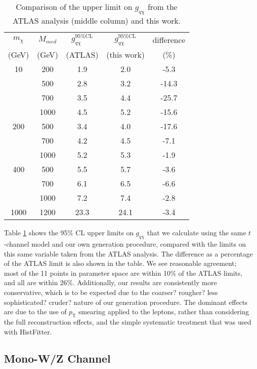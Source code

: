 \begin{flushleft}
\begin{table}
\begin{center}
\begin{tabular}{| c | c | c | c | c |}
\hline
$m_{\chi}$ & $M_{med}$ & $g_{q \chi}^{95\%\mathrm{CL}}$ & $g_{q \chi}^{95\%\mathrm{CL}}$ & difference \T \\
(GeV) & (GeV) & (ATLAS) & (this work) & (\%) \B \\
\hline
\hline
10 & 200 & 1.9 & 2.0 & -5.3 \T \\
 & 500 & 2.8 & 3.2 & -14.3 \\
 & 700 & 3.5 & 4.4 & -25.7 \\
 & 1000 & 4.5 & 5.2 & -15.6 \\
200 & 500 & 3.4 & 4.0 & -17.6 \T \\
 & 700 & 4.2 & 4.5 & -7.1 \\
 & 1000 & 5.2 & 5.3 & -1.9 \\
400 & 500 & 5.5 & 5.7 & -3.6 \T \\
 & 700 & 6.1 & 6.5 & -6.6 \\
 & 1000 & 7.2 & 7.4 & -2.8 \\
1000 & 1200 & 23.3 & 24.1 & -3.4 \T \B \\
\hline
\end{tabular}
\end{center}
\caption{Comparison of the upper limit on $g_{q \chi}$ from the ATLAS analysis (middle column) and this work.}
\label{tab:monoZvalidation}
\end{table} 

Table \ref{tab:monoZvalidation} shows the 95\% CL upper limits on $g_{q \chi}$ that we calculate using the same $t$-channel model and our own generation procedure, compared with the limits on this same variable taken from the ATLAS analysis. The difference as a percentage of the ATLAS limit is also shown in the table. We see reasonable agreement; most of the 11 points in parameter space are within 10\% of the ATLAS limits, and all are within 26\%. Additionally, our results are consistently more conservative, which is to be expected due to the coarser? rougher? less sophisticated? cruder? nature of our generation procedure. The dominant effects are due to the use of $p_{\mathrm{T}}$ smearing applied to the leptons, rather than considering the full reconstruction effects, and the simple systematic treatment that was used with HistFitter.

\end{flushleft}

\subsection{Mono-W/Z Channel}
\label{monoWZ_validation}
\begin{flushleft}
\end{flushleft}
